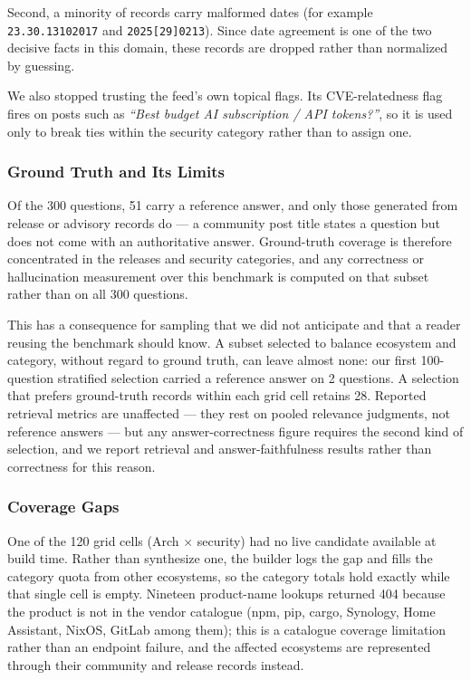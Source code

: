 \documentclass[acmsmall,review,anonymous,screen]{acmart}
\begin{document}
Second, a minority of records carry malformed dates (for example
\texttt{23.30.13102017} and \texttt{2025[29]0213}). Since date agreement is one
of the two decisive facts in this domain, these records are dropped rather than
normalized by guessing.

We also stopped trusting the feed's own topical flags. Its CVE-relatedness flag
fires on posts such as \emph{``Best budget AI subscription / API tokens?''}, so
it is used only to break ties within the security category rather than to assign
one.

\subsubsection{Ground Truth and Its Limits}

Of the 300 questions, 51 carry a reference answer, and only those generated from
release or advisory records do --- a community post title states a question but
does not come with an authoritative answer. Ground-truth coverage is therefore
concentrated in the releases and security categories, and any correctness or
hallucination measurement over this benchmark is computed on that subset rather
than on all 300 questions.

This has a consequence for sampling that we did not anticipate and that a
reader reusing the benchmark should know. A subset selected to balance ecosystem
and category, without regard to ground truth, can leave almost none: our first
100-question stratified selection carried a reference answer on 2 questions. A
selection that prefers ground-truth records within each grid cell retains 28.
Reported retrieval metrics are unaffected --- they rest on pooled relevance
judgments, not reference answers --- but any answer-correctness figure requires
the second kind of selection, and we report retrieval and answer-faithfulness
results rather than correctness for this reason.

\subsubsection{Coverage Gaps}

One of the 120 grid cells (Arch $\times$ security) had no live candidate
available at build time. Rather than synthesize one, the builder logs the gap
and fills the category quota from other ecosystems, so the category totals hold
exactly while that single cell is empty. Nineteen product-name lookups returned
404 because the product is not in the vendor catalogue (npm, pip, cargo,
Synology, Home Assistant, NixOS, GitLab among them); this is a catalogue
coverage limitation rather than an endpoint failure, and the affected ecosystems
are represented through their community and release records instead.
\end{document}
